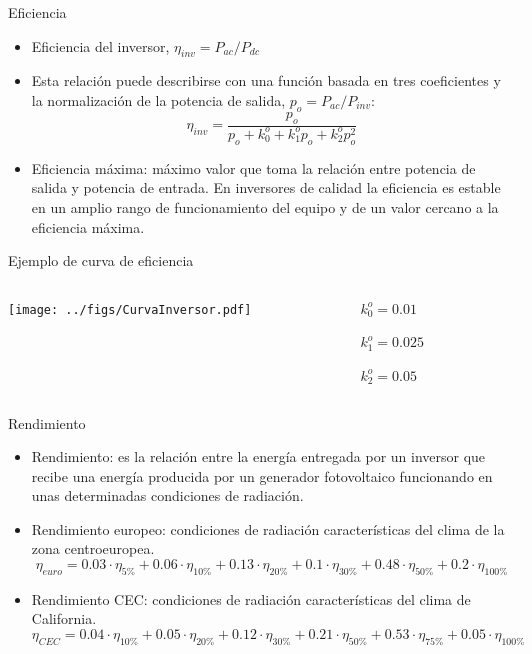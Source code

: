 \documentclass[aspectratio=169, usenames,svgnames,dvipsnames]{beamer}
\begin{document}
\begin{frame}[label={sec:org145f8a4}]{Eficiencia}
\begin{itemize}
\item \alert{Eficiencia del inversor}, \(\eta_{inv} = P_{ac} / P_{dc}\)

\item Esta relación puede describirse con una función basada en tres
coeficientes y la normalización de la potencia de salida,
\(p_{o}=P_{ac}/P_{inv}\):
$$\eta_{inv}=\frac{p_{o}}{p_{o}+k_{0}^{o}+k_{1}^{o}p_{o}+k_{2}^{o}p_{o}^{2}}$$

\item \alert{Eficiencia máxima}: máximo valor que toma la relación entre
potencia de salida y potencia de entrada. En inversores de calidad
la eficiencia es estable en un amplio rango de funcionamiento del
equipo y de un valor cercano a la eficiencia máxima.
\end{itemize}
\end{frame}


\begin{frame}[label={sec:org9d8624f}]{Ejemplo de curva de eficiencia}
\begin{columns}
\begin{column}{0.8\columnwidth}
\begin{center}
\texttt{[image: ../figs/CurvaInversor.pdf]}
\end{center}
\end{column}


\begin{column}{0.2\columnwidth}
\(k_{0}^{o}=0.01\)

\(k_{1}^{o}=0.025\)

\(k_{2}^{o}=0.05\)
\end{column}
\end{columns}
\end{frame}

\begin{frame}[label={sec:org3ff2b49}]{Rendimiento}
\begin{itemize}
\item \alert{Rendimiento}: es la relación entre la energía entregada por
un inversor que recibe una energía producida por un generador
fotovoltaico funcionando en unas determinadas condiciones de radiación.

\item \alert{Rendimiento europeo}: condiciones de radiación características del
clima de la zona centroeuropea.
\[
  \eta_{euro} = 0.03 \cdot \eta_{5\%}  +  0.06 \cdot \eta_{10\%}  +  0.13 \cdot \eta_{20\%}  +  0.1 \cdot \eta_{30\%}  +  0.48 \cdot \eta_{50\%}  +  0.2 \cdot \eta_{100\%}
\]
\item \alert{Rendimiento CEC}: condiciones de radiación características del clima de
California.
\[
  \eta_{CEC} = 0.04 \cdot \eta_{10\%}  +  0.05 \cdot \eta_{20\%}  +  0.12 \cdot \eta_{30\%}  +  0.21 \cdot \eta_{50\%} + 0.53 \cdot \eta_{75\%}  +  0.05 \cdot \eta_{100\%}
\]
\end{itemize}
\end{frame}
\end{document}
